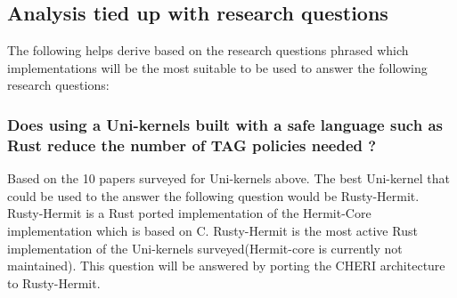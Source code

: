 







\subsection{Analysis tied up with research questions}
The following helps derive based on the research questions phrased which implementations 
will be the most suitable to be used to answer the following research questions: 

\subsubsection{Does using a Uni-kernels built with a safe language such as Rust reduce the number of TAG policies needed ?}
Based on the 10 papers surveyed for Uni-kernels above. The best Uni-kernel that could 
be used to the answer the following question would be Rusty-Hermit. Rusty-Hermit is a Rust 
ported implementation of the Hermit-Core implementation which is based on C. Rusty-Hermit is the most active Rust 
implementation of the Uni-kernels surveyed(Hermit-core is currently not maintained). This question will be answered 
by porting the CHERI architecture to Rusty-Hermit.

